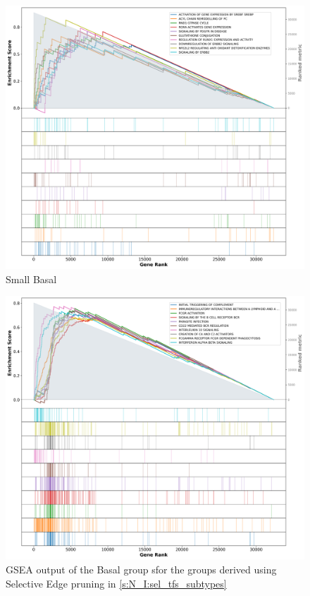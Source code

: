 \begin{figure}[!htb]
    \centering
    \includegraphics[width=\textwidth,keepaspectratio]{Sections/Network_I/Resources/selective_pruning/gsea/smallBasal_10_top_manTerms.png}
    \caption{Small Basal}
    \label{fig:ap:gsea_smallBasal}
\end{figure}


\begin{figure}[!htb]
    \centering
    \includegraphics[width=\textwidth,keepaspectratio]{Sections/Network_I/Resources/selective_pruning/gsea/largeBasal_10_top_manTerms.png}
    \caption{GSEA output of the Basal group sfor the groups derived using Selective Edge pruning in  \cref{s:N_I:sel_tfs_subtypes}}
    \label{fig:ap:gsea_largeBasal}
\end{figure}

